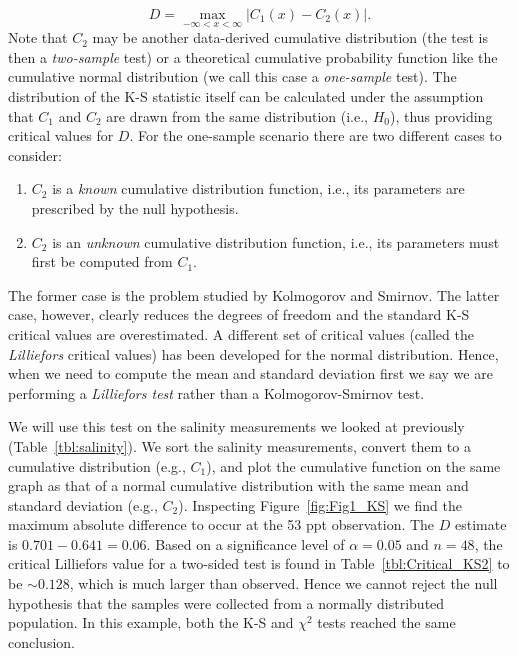 \begin{equation}
D = \max_{-\infty < x < \infty} |C_1 (x) - C_2 (x) |.
\end{equation}
Note that $C_2$ may be another data-derived cumulative distribution (the test is then a \emph{two-sample} test)
or a theoretical cumulative probability function like the cumulative normal 
distribution (we call this case a \emph{one-sample} test).  The distribution of the K-S statistic itself can be calculated under the assumption 
that $C_1$ and $C_2$ are drawn from the same distribution (i.e., $H_0$), thus providing critical values for $D$.  For the one-sample
scenario there are two different cases to consider:
\begin{enumerate}
	\item $C_2$ is a \emph{known} cumulative distribution function, i.e., its parameters are prescribed
	by the null hypothesis.
	\item $C_2$ is an \emph{unknown} cumulative distribution function, i.e., its parameters must first
	be computed from $C_1$.
\end{enumerate}
The former case is the problem studied by Kolmogorov and Smirnov. The latter case, however, clearly reduces the
degrees of freedom and the standard K-S critical values are overestimated.
A different set of critical values (called the \emph{Lilliefors} critical values) has been developed for the normal
distribution.  Hence, when we need to compute the mean and standard deviation first we say we are performing a
\emph{Lilliefors test} rather than a Kolmogorov-Smirnov test.

We will use this test on the salinity measurements we looked at previously (Table~\ref{tbl:salinity}).
We sort the salinity measurements, convert them to a cumulative distribution (e.g., $C_1$), and plot the cumulative function
on the same graph as that of a normal cumulative distribution with the same mean and standard deviation (e.g., $C_2$).
Inspecting Figure~\ref{fig:Fig1_KS} we find the maximum absolute 
difference to occur at the 53 ppt observation.  The $D$ estimate is $0.701 - 0.641 
= 0.06$.  Based on a significance level of $\alpha = 0.05$ and $n = 48$, the critical Lilliefors value for a two-sided test
is found in Table~\ref{tbl:Critical_KS2} to be $\sim 0.128$, which is much 
larger than observed.  Hence we cannot reject the null hypothesis that the samples were collected 
from a normally distributed population.  In this example, both the K-S and $\chi^2$ tests reached the same conclusion.


